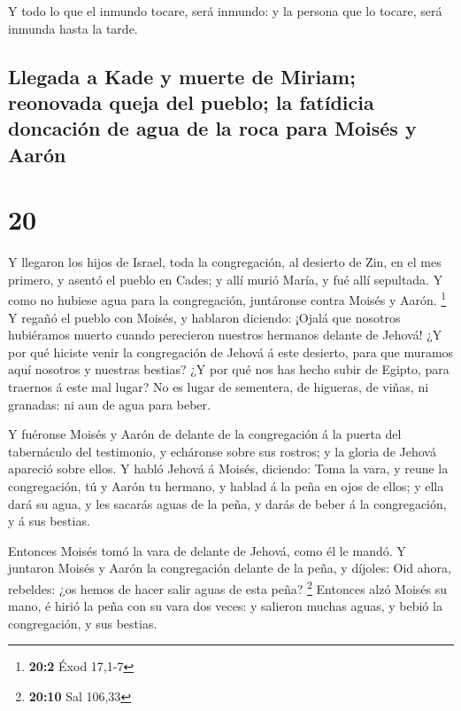  Y todo lo que el inmundo tocare, será inmundo: y la
persona que lo tocare, será inmunda hasta la tarde.

\hypertarget{llegada-a-kade-y-muerte-de-miriam-reonovada-queja-del-pueblo-la-fatuxeddicia-doncaciuxf3n-de-agua-de-la-roca-para-moisuxe9s-y-aaruxf3n}{%
\subsection{Llegada a Kade y muerte de Miriam; reonovada queja del
pueblo; la fatídicia doncación de agua de la roca para Moisés y
Aarón}\label{llegada-a-kade-y-muerte-de-miriam-reonovada-queja-del-pueblo-la-fatuxeddicia-doncaciuxf3n-de-agua-de-la-roca-para-moisuxe9s-y-aaruxf3n}}

\hypertarget{section-19}{%
\section{20}\label{section-19}}

 Y llegaron los hijos de Israel, toda la congregación, al
desierto de Zin, en el mes primero, y asentó el pueblo en Cades; y allí
murió María, y fué allí sepultada.  Y como no hubiese agua
para la congregación, juntáronse contra Moisés y Aarón. \footnote{\textbf{20:2}
  Éxod 17,1-7}  Y regañó el pueblo con Moisés, y hablaron
diciendo: ¡Ojalá que nosotros hubiéramos muerto cuando perecieron
nuestros hermanos delante de Jehová!  ¿Y por qué hiciste
venir la congregación de Jehová á este desierto, para que muramos aquí
nosotros y nuestras bestias?  ¿Y por qué nos has hecho subir
de Egipto, para traernos á este mal lugar? No es lugar de sementera, de
higueras, de viñas, ni granadas: ni aun de agua para beber.

 Y fuéronse Moisés y Aarón de delante de la congregación á
la puerta del tabernáculo del testimonio, y echáronse sobre sus rostros;
y la gloria de Jehová apareció sobre ellos.  Y habló Jehová
á Moisés, diciendo:  Toma la vara, y reune la congregación,
tú y Aarón tu hermano, y hablad á la peña en ojos de ellos; y ella dará
su agua, y les sacarás aguas de la peña, y darás de beber á la
congregación, y á sus bestias.

 Entonces Moisés tomó la vara de delante de Jehová, como él
le mandó.  Y juntaron Moisés y Aarón la congregación
delante de la peña, y díjoles: Oid ahora, rebeldes: ¿os hemos de hacer
salir aguas de esta peña? \footnote{\textbf{20:10} Sal 106,33}
 Entonces alzó Moisés su mano, é hirió la peña con su vara
dos veces: y salieron muchas aguas, y bebió la congregación, y sus
bestias.

